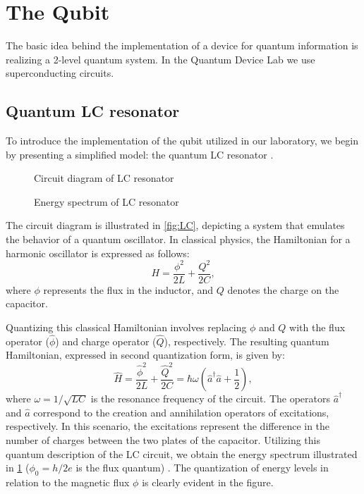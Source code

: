 \section{The Qubit}
\label{sec:qubit}

The basic idea behind the implementation of a device for quantum information is realizing a 2-level quantum system.
In the Quantum Device Lab we use superconducting circuits.

\subsection{Quantum LC resonator}

To introduce the implementation of the qubit utilized in our laboratory, we begin by presenting a simplified model: the quantum LC resonator \cite{LC_resonator}.
\begin{figure}
    \begin{minipage}[b]{0.5\linewidth}
      \centering
        
        \vspace{-0.7cm}
        \caption{Circuit diagram of LC resonator}
        \label{fig:LC}
    \end{minipage}
    \hfill
    \begin{minipage}[b]{0.45\linewidth}
      \centering
      
      \vspace{-1.5cm}
      \caption{Energy spectrum of LC resonator}
      \label{fig:Energy_spectrum}
    \end{minipage}
  \end{figure}
The circuit diagram is illustrated in \cref{fig:LC}, depicting a system that emulates the behavior of a quantum oscillator.
In classical physics, the Hamiltonian for a harmonic oscillator is expressed as follows:
\begin{equation}
    H = \frac{\phi^2}{2L} + \frac{Q^2}{2C},
\end{equation}
where $\phi$ represents the flux in the inductor, and $Q$ denotes the charge on the capacitor.

Quantizing this classical Hamiltonian involves replacing $\phi$ and $Q$ with the flux operator ($\hat{\phi}$) and charge operator ($\hat{Q}$), respectively.
The resulting quantum Hamiltonian, expressed in second quantization form, is given by:
\begin{equation}
    \hat{H} = \frac{\hat{\phi}^2}{2L} + \frac{\hat{Q}^2}{2C} = \hbar \omega \left(\hat{a}^\dagger \hat{a} + \frac{1}{2}\right),
\end{equation}
where $\omega = 1/\sqrt{LC}$ is the resonance frequency of the circuit.
The operators $\hat{a}^\dagger$ and $\hat{a}$ correspond to the creation and annihilation operators of excitations, respectively. 
In this scenario, the excitations represent the difference in the number of charges between the two plates of the capacitor.
Utilizing this quantum description of the LC circuit, we obtain the energy spectrum illustrated in \cref{fig:Energy_spectrum} ($\phi_0 = h/2e$ is the flux quantum) .
The quantization of energy levels in relation to the magnetic flux $\phi$ is clearly evident in the figure.

